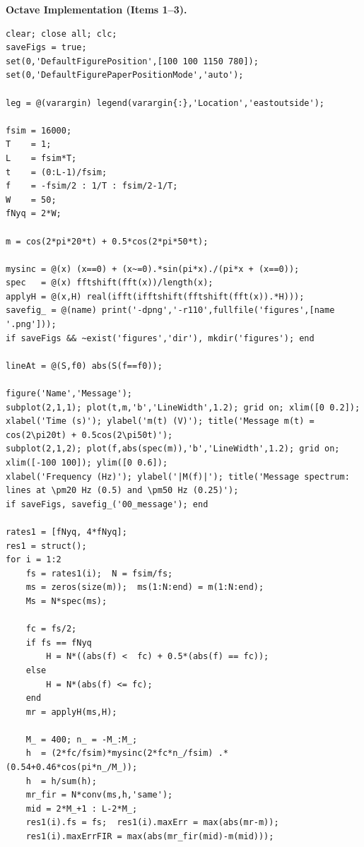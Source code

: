 \documentclass[a4paper]{article}
\begin{document}
\noindent\textbf{Octave Implementation (Items 1--3).}\par\smallskip
\begin{lstlisting}[basicstyle=\ttfamily\scriptsize, breaklines=true, breakatwhitespace=true, frame=single, xleftmargin=6pt, xrightmargin=6pt, framexleftmargin=6pt, framexrightmargin=6pt, aboveskip=4pt, belowskip=6pt]
clear; close all; clc;
saveFigs = true;
set(0,'DefaultFigurePosition',[100 100 1150 780]);
set(0,'DefaultFigurePaperPositionMode','auto');

leg = @(varargin) legend(varargin{:},'Location','eastoutside');

fsim = 16000;
T    = 1;
L    = fsim*T;
t    = (0:L-1)/fsim;
f    = -fsim/2 : 1/T : fsim/2-1/T;
W    = 50;
fNyq = 2*W;

m = cos(2*pi*20*t) + 0.5*cos(2*pi*50*t);

mysinc = @(x) (x==0) + (x~=0).*sin(pi*x)./(pi*x + (x==0));
spec   = @(x) fftshift(fft(x))/length(x);
applyH = @(x,H) real(ifft(ifftshift(fftshift(fft(x)).*H)));
savefig_ = @(name) print('-dpng','-r110',fullfile('figures',[name '.png']));
if saveFigs && ~exist('figures','dir'), mkdir('figures'); end

lineAt = @(S,f0) abs(S(f==f0));

figure('Name','Message');
subplot(2,1,1); plot(t,m,'b','LineWidth',1.2); grid on; xlim([0 0.2]);
xlabel('Time (s)'); ylabel('m(t) (V)'); title('Message m(t) = cos(2\pi20t) + 0.5cos(2\pi50t)');
subplot(2,1,2); plot(f,abs(spec(m)),'b','LineWidth',1.2); grid on; xlim([-100 100]); ylim([0 0.6]);
xlabel('Frequency (Hz)'); ylabel('|M(f)|'); title('Message spectrum: lines at \pm20 Hz (0.5) and \pm50 Hz (0.25)');
if saveFigs, savefig_('00_message'); end

rates1 = [fNyq, 4*fNyq];
res1 = struct();
for i = 1:2
    fs = rates1(i);  N = fsim/fs;
    ms = zeros(size(m));  ms(1:N:end) = m(1:N:end);
    Ms = N*spec(ms);

    fc = fs/2;
    if fs == fNyq
        H = N*((abs(f) <  fc) + 0.5*(abs(f) == fc));
    else
        H = N*(abs(f) <= fc);
    end
    mr = applyH(ms,H);

    M_ = 400; n_ = -M_:M_;
    h  = (2*fc/fsim)*mysinc(2*fc*n_/fsim) .* (0.54+0.46*cos(pi*n_/M_));
    h  = h/sum(h);
    mr_fir = N*conv(ms,h,'same');
    mid = 2*M_+1 : L-2*M_;
    res1(i).fs = fs;  res1(i).maxErr = max(abs(mr-m));
    res1(i).maxErrFIR = max(abs(mr_fir(mid)-m(mid)));


\end{lstlisting}
\end{document}
